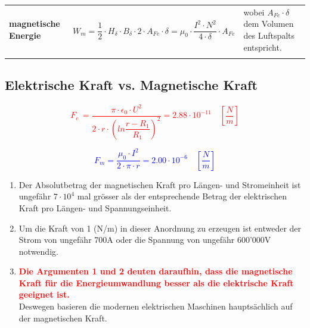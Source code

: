 \begin{longtable}{| p{} | p{} | p{} |}
        \textbf{magnetische Energie} & \begin{equation*}
        W_m = \dfrac{1}{2}\cdot H_\delta\cdot B_\delta\cdot2\cdot A_{Fe}\cdot\delta = \mu_0\cdot \dfrac{I^2\cdot N^2}{4\cdot\delta}\cdot A_{Fe}
        \end{equation*} & wobei $A_{Fe}\cdot\delta$ dem Volumen des Luftspalts entspricht. \\
        \lasthline
    \end{longtable}
    \clearpage
    \newpage

\subsection{Elektrische Kraft vs. Magnetische Kraft}
    \begin{minipage}{0.5\textwidth}
    	\centering
        \textcolor{red}{\begin{equation*}F_e\, = \dfrac{\pi\cdot\epsilon_0\cdot U^2}{2\cdot r\cdot\left(ln\dfrac{r-R_1}{R_1}\right)^2} = 2.88\cdot 10^{-11} \quad \left[\dfrac{N}{m}\right]\end{equation*}}
        \end{minipage}
        \begin{minipage}{0.5\textwidth}
        	\centering
        \textcolor{blue}{\begin{equation*}F_m = \dfrac{\mu_0\cdot I^2}{2\cdot\pi\cdot r} = 2.00 \cdot 10^{-6} \quad\left[\dfrac{N}{m}\right]\end{equation*}}
    \end{minipage}
    \begin{enumerate}
    	\item Der Absolutbetrag der magnetischen Kraft pro Längen- und Stromeinheit ist
    	ungefähr $7\cdot10^4$ mal grösser als der entsprechende Betrag der elektrischen Kraft
    	pro Längen- und Spannungseinheit.
    	\item Um die Kraft von 1 (N/m) in dieser Anordnung zu erzeugen ist entweder der
    	Strom von ungefähr 700A oder die Spannung von ungefähr 600'000V notwendig.
    	\item \textcolor{red}{\textbf{Die Argumenten 1 und 2 deuten daraufhin, dass die magnetische Kraft für die Energieumwandlung besser als die elektrische Kraft geeignet ist.}}\\[0.2cm]
    	Deswegen basieren die modernen elektrischen Maschinen hauptsächlich auf der magnetischen Kraft.
    \end{enumerate}
\clearpage
\newpage